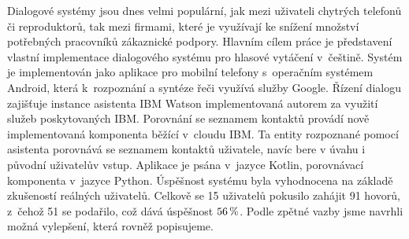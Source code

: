 \documentclass[12pt]{report}
\begin{document}

Dialogové systémy jsou dnes velmi populární, jak mezi uživateli chytrých
telefonů či reproduktorů, tak mezi firmami, které je využívají ke snížení
množství potřebných pracovníků zákaznické podpory.
Hlavním cílem práce je představení vlastní implementace dialogového systému
pro hlasové vytáčení v~češtině. Systém je implementován jako aplikace
pro mobilní telefony s~operačním systémem Android, která k~rozpoznání
a syntéze řeči využívá služby Google. Řízení dialogu zajišťuje instance asistenta
IBM Watson implementovaná autorem za využití služeb poskytovaných IBM.
Porovnání se seznamem kontaktů provádí nově implementovaná komponenta běžící
v~cloudu IBM. Ta entity rozpoznané pomocí asistenta porovnává se seznamem kontaktů
uživatele, navíc bere v úvahu i původní uživatelův vstup.
Aplikace je psána v~jazyce Kotlin, porovnávací komponenta
v~jazyce Python. Úspěšnost systému byla vyhodnocena
na základě zkušeností reálných uživatelů. Celkově se 15 uživatelů pokusilo
zahájit 91 hovorů, z~čehož 51 se podařilo, což dává úspěšnost \(56\,\rm \%\).
Podle zpětné vazby jsme navrhli možná vylepšení, která rovněž popisujeme.
\end{document}
